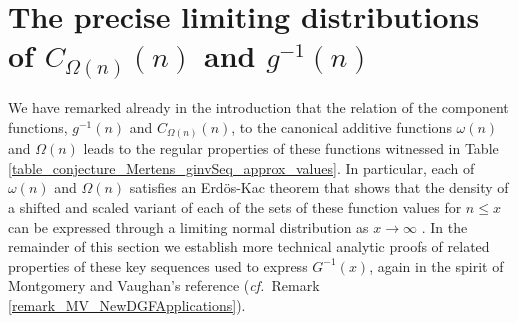 \documentclass[11pt,reqno,a4letter]{article}
\numberwithin{figure}{section}
\numberwithin{table}{section}
\newcommand{\cf}{\textit{cf.\ }}
\theoremstyle{plain}
\numberwithin{theorem}{section}
\theoremstyle{definition}
\begin{document}
\newpage
\section{The precise limiting distributions of 
         $C_{\Omega(n)}(n)$ and $g^{-1}(n)$} 
\label{Section_NewFormulasForgInvn} 

We have remarked already in the introduction that the relation of the component 
functions, $g^{-1}(n)$ and $C_{\Omega(n)}(n)$, to the canonical additive functions 
$\omega(n)$ and $\Omega(n)$ leads to the regular properties of these functions 
witnessed in Table \ref{table_conjecture_Mertens_ginvSeq_approx_values}. 
In particular, each of $\omega(n)$ and $\Omega(n)$ satisfies 
an Erd\"os-Kac theorem that shows that the density of a shifted and scaled variant of each 
of the sets of these function values for $n \leq x$ can be expressed through a 
limiting normal distribution as $x \rightarrow \infty$ 
\cite{ERDOS-KAC-REF,BILLINGSLY-CLT-PRIMEDIVFUNC,RENYI-TURAN}. 
In the remainder of this section we establish more technical analytic proofs of 
related properties of these key sequences used to express $G^{-1}(x)$, 
again in the spirit of Montgomery and Vaughan's reference 
(\cf Remark \ref{remark_MV_NewDGFApplications}). 
\end{document}

